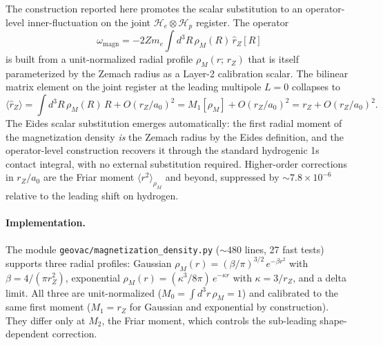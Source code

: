 \documentclass[twocolumn,prc,amsmath,amssymb,superscriptaddress]{revtex4-2}
\begin{document}
The construction reported here promotes the scalar substitution to an
operator-level inner-fluctuation on the joint
$\mathcal{H}_e \otimes \mathcal{H}_p$ register. The operator
\begin{equation}
  \omega_{\mathrm{magn}}
  = -2 Z m_e \int d^3 R\, \rho_M(R)\, \hat r_Z[R]
\end{equation}
is built from a unit-normalized radial profile $\rho_M(r;\,r_Z)$ that
is itself parameterized by the Zemach radius as a Layer-2 calibration
scalar. The bilinear matrix element on the joint register at the
leading multipole $L = 0$ collapses to
\begin{equation}
  \langle \hat r_Z \rangle
  = \int d^3 R\,\rho_M(R)\, R + O(r_Z/a_0)^2
  = M_1[\rho_M] + O(r_Z/a_0)^2
  = r_Z + O(r_Z/a_0)^2.
\label{eq:rZ-collapse}
\end{equation}
The Eides scalar substitution emerges automatically: the first radial
moment of the magnetization density \emph{is} the Zemach radius by the
Eides definition, and the operator-level construction recovers it
through the standard hydrogenic 1s contact integral, with no external
substitution required. Higher-order corrections in $r_Z/a_0$ are the
Friar moment $\langle r^2 \rangle_{\rho_M}$ and beyond, suppressed by
$\sim 7.8 \times 10^{-6}$ relative to the leading shift on hydrogen.

\paragraph{Implementation.}
The module \texttt{geovac/magnetization\_density.py} ($\sim 480$ lines,
27 fast tests) supports three radial profiles: Gaussian
$\rho_M(r) = (\beta/\pi)^{3/2}\,e^{-\beta r^2}$ with
$\beta = 4/(\pi r_Z^2)$, exponential
$\rho_M(r) = (\kappa^3/8\pi)\,e^{-\kappa r}$ with $\kappa = 3/r_Z$,
and a delta limit. All three are unit-normalized
($M_0 = \int d^3 r\, \rho_M = 1$) and calibrated to the same first
moment ($M_1 = r_Z$ for Gaussian and exponential by construction). They
differ only at $M_2$, the Friar moment, which controls the sub-leading
shape-dependent correction.
\end{document}
